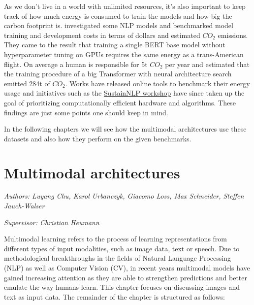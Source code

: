 \documentclass[
]{krantz}
\begin{document}
As we don't live in a world with unlimited resources, it's also important to keep track of how much energy is consumed to train the models and how big the carbon footprint is. \citet{strubell2019energy} investigated some NLP models and benchmarked model training and development costs in terms of dollars and estimated \(CO_2\) emissions. They came to the result that training a single BERT base model without hyperparameter tuning on GPUs requires the same energy as a trans-American flight. On average a human is responsible for 5t \(CO_2\) per year and \citet{strubell2019energy} estimated that the training procedure of a big Transformer with neural architecture search emitted 284t of \(CO_2\). Works \citep[\citet{henderson2020towards}]{lottick2019energy} have released online tools to benchmark their energy usage and initiatives such as the \href{https://sites.google.com/view/sustainlp2020/organization}{SustainNLP workshop} have since taken up the goal of prioritizing computationally efficient hardware and algorithms. These findings are just some points one should keep in mind.

In the following chapters we will see how the multimodal architectures use these datasets and also how they perform on the given benchmarks.

\hypertarget{c02-00-multimodal}{%
\chapter{Multimodal architectures}\label{c02-00-multimodal}}

\emph{Authors: Luyang Chu, Karol Urbanczyk, Giacomo Loss, Max Schneider, Steffen Jauch-Walser}

\emph{Supervisor: Christian Heumann}

Multimodal learning refers to the process of learning representations from different types of input modalities, such as image data, text or speech.
Due to methodological breakthroughs in the fields of Natural Language Processing (NLP) as well as Computer Vision (CV), in recent years multimodal models have gained increasing attention as they are able to strengthen predictions and better emulate the way humans learn.
This chapter focuses on discussing images and text as input data.
The remainder of the chapter is structured as follows:
\end{document}
